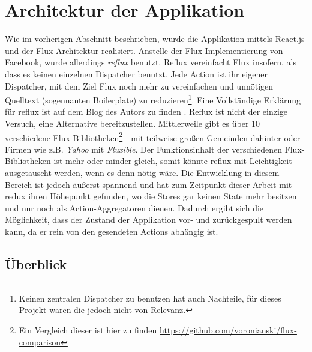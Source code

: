 \documentclass[12pt,twoside]{book}
\begin{document}
\section{Architektur der Applikation}

Wie im vorherigen Abschnitt beschrieben, wurde die Applikation mittels React.js und der Flux-Architektur realisiert. Anstelle der Flux-Implementierung von Facebook, wurde allerdings \textit{reflux} benutzt. Reflux vereinfacht Flux insofern, als dass es keinen einzelnen Dispatcher benutzt. Jede Action ist ihr eigener Dispatcher, mit dem Ziel Flux noch mehr zu vereinfachen und unnötigen Quelltext (sogennanten Boilerplate) zu reduzieren\footnote{Keinen zentralen Dispatcher zu benutzen hat auch Nachteile, für dieses Projekt waren die jedoch nicht von Relevanz.}. Eine Vollständige Erklärung für reflux ist auf dem Blog des Autors zu finden \cite{reflux}. Reflux ist nicht der einzige Versuch, eine Alternative bereitzustellen. Mittlerweile gibt es über 10 verschiedene Flux-Bibliotheken\footnote{Ein Vergleich dieser ist hier zu finden \url{https://github.com/voronianski/flux-comparison}} - mit teilweise großen Gemeinden dahinter oder Firmen wie z.B. \textit{Yahoo} mit \textit{Fluxible}. Der Funktionsinhalt der verschiedenen Flux-Bibliotheken ist mehr oder minder gleich, somit könnte reflux mit Leichtigkeit ausgetauscht werden, wenn es denn nötig wäre.
Die Entwicklung in diesem Bereich ist jedoch äußerst spannend und hat zum Zeitpunkt dieser Arbeit mit redux \cite{gitredux} ihren Höhepunkt gefunden, wo die Stores gar keinen State mehr besitzen und nur noch als Action-Aggregatoren dienen. Dadurch ergibt sich die Möglichkeit, dass der Zustand der Applikation vor- und zurückgespult werden kann, da er rein von den gesendeten Actions abhängig ist\citep{redux}.


\subsection{Überblick}
\end{document}
